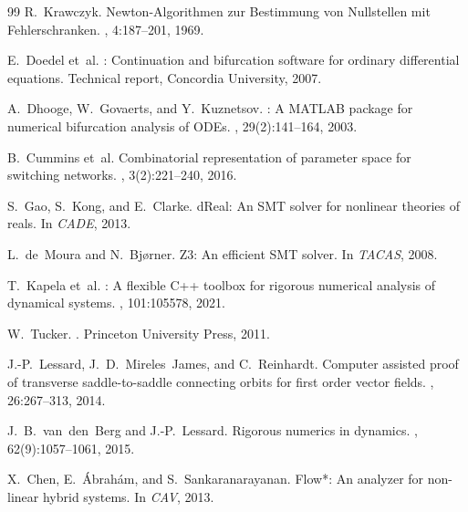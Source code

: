 \documentclass[11pt]{article}
\begin{document}

\begin{thebibliography}{99}
R.~Krawczyk.
\newblock Newton-{A}lgorithmen zur {B}estimmung von {N}ullstellen mit {F}ehlerschranken.
, 4:187--201, 1969.

E.~Doedel et~al.
: Continuation and bifurcation software for ordinary differential equations.
\newblock Technical report, Concordia University, 2007.

A.~Dhooge, W.~Govaerts, and Y.~Kuznetsov.
: A {MATLAB} package for numerical bifurcation analysis of {ODE}s.
, 29(2):141--164, 2003.

B.~Cummins et~al.
\newblock Combinatorial representation of parameter space for switching networks.
, 3(2):221--240, 2016.

S.~Gao, S.~Kong, and E.~Clarke.
\newblock d{R}eal: An {SMT} solver for nonlinear theories of reals.
\newblock In {\em CADE}, 2013.

L.~de~Moura and N.~Bj{\o}rner.
\newblock Z3: An efficient {SMT} solver.
\newblock In {\em TACAS}, 2008.

T.~Kapela et~al.
: A flexible {C++} toolbox for rigorous numerical analysis of dynamical systems.
, 101:105578, 2021.

W.~Tucker.
.
\newblock Princeton University Press, 2011.

J.-P.~Lessard, J.~D.~Mireles~James, and C.~Reinhardt.
\newblock Computer assisted proof of transverse saddle-to-saddle connecting orbits for first order vector fields.
, 26:267--313, 2014.

J.~B.~van~den~Berg and J.-P.~Lessard.
\newblock Rigorous numerics in dynamics.
, 62(9):1057--1061, 2015.

X.~Chen, E.~{\'A}brah{\'a}m, and S.~Sankaranarayanan.
\newblock Flow*: An analyzer for non-linear hybrid systems.
\newblock In {\em CAV}, 2013.


\end{thebibliography}
\end{document}
